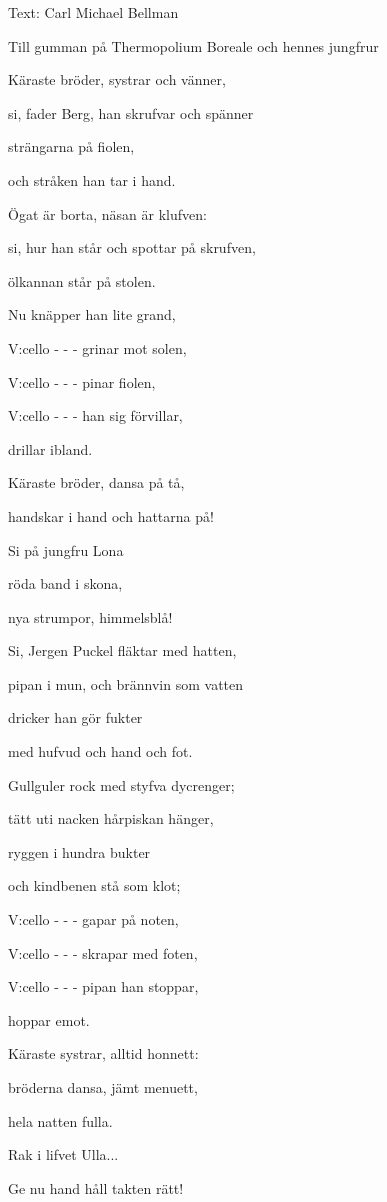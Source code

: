 Text: Carl Michael Bellman

Till gumman på Thermopolium Boreale och hennes jungfrur\bigskip

Käraste bröder, systrar och vänner,

si, fader Berg, han skrufvar och spänner

strängarna på fiolen,

och stråken han tar i hand.

Ögat är borta, näsan är klufven:

si, hur han står och spottar på skrufven,

ölkannan står på stolen.

Nu knäpper han lite grand,

V:cello - - - grinar mot solen,

V:cello - - - pinar fiolen,

V:cello - - - han sig förvillar,

drillar ibland.

Käraste bröder, dansa på tå,

handskar i hand och hattarna på!

Si på jungfru Lona

röda band i skona,

nya strumpor, himmelsblå!

Si, Jergen Puckel fläktar med hatten,

pipan i mun, och brännvin som vatten

dricker han gör fukter

med hufvud och hand och fot.\bigskip



Gullguler rock med styfva dycrenger;

tätt uti nacken hårpiskan hänger,

ryggen i hundra bukter

och kindbenen stå som klot;

V:cello - - - gapar på noten,

V:cello - - - skrapar med foten,

V:cello - - - pipan han stoppar,

hoppar emot.

Käraste systrar, alltid honnett:

bröderna dansa, jämt menuett,

hela natten fulla.

Rak i lifvet Ulla...

Ge nu hand håll takten rätt!\bigskip



